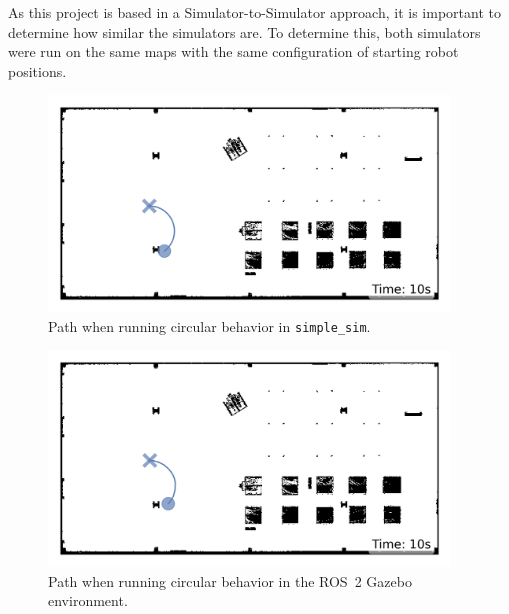 As this project is based in a Simulator-to-Simulator approach, it is important to determine how similar the simulators are. To determine this, both simulators were run on the same maps with the same configuration of starting robot positions.

\begin{figure}[H]
    \begin{center}
        \includegraphics[width=0.95\textwidth]{./figures/consistency/simple-sim-paths-(after-10s)_rough_tune.png}
    \end{center}
    \caption{Path when running circular behavior in \texttt{simple\_sim}.}
    \label{fig:movement-simple-benchmark}
\end{figure}
\begin{figure}[H]
    \begin{center}
        \includegraphics[width=0.95\textwidth]{./figures/consistency/ros-2-paths-(after-10s)_rough_tune.png}
    \end{center}
    \caption{Path when running circular behavior in the ROS~2 Gazebo environment.}
    \label{fig:movement-ros2-benchmark}
\end{figure}

